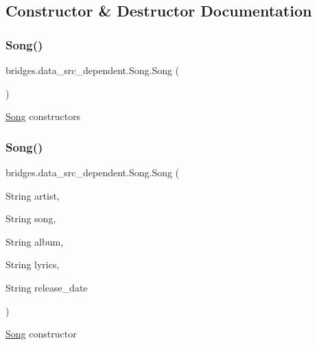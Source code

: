 \subsection{Constructor \& Destructor Documentation}
\mbox{\label{classbridges_1_1data__src__dependent_1_1_song_a824052caca0b9c03d07c42e9e7740020}} 
\subsubsection{\texorpdfstring{Song()}{Song()}\hspace{0.1cm}{\footnotesize\ttfamily [1/2]}}
{\footnotesize\ttfamily bridges.\+data\+\_\+src\+\_\+dependent.\+Song.\+Song (\begin{DoxyParamCaption}{ }\end{DoxyParamCaption})}

\hyperlink{classbridges_1_1data__src__dependent_1_1_song}{Song} constructors \mbox{\label{classbridges_1_1data__src__dependent_1_1_song_a78506e63f4d91dc1f0d821050a093ad6}} 
\subsubsection{\texorpdfstring{Song()}{Song()}\hspace{0.1cm}{\footnotesize\ttfamily [2/2]}}
{\footnotesize\ttfamily bridges.\+data\+\_\+src\+\_\+dependent.\+Song.\+Song (\begin{DoxyParamCaption}\item[{String}]{artist,  }\item[{String}]{song,  }\item[{String}]{album,  }\item[{String}]{lyrics,  }\item[{String}]{release\+\_\+date }\end{DoxyParamCaption})}

\hyperlink{classbridges_1_1data__src__dependent_1_1_song}{Song} constructor


